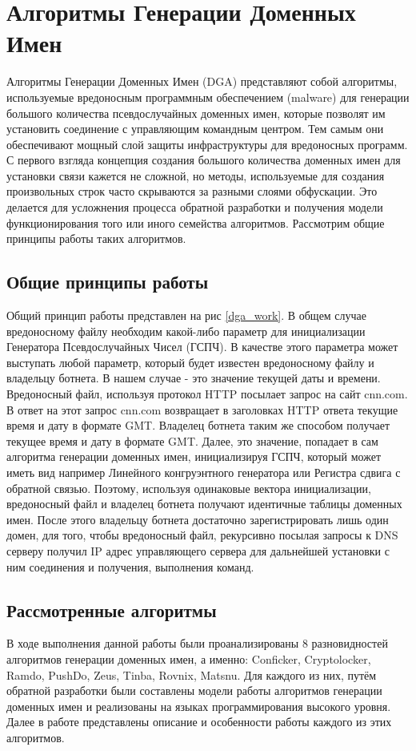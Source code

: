 \section{Алгоритмы Генерации Доменных Имен}\label{dga}
Алгоритмы Генерации Доменных Имен (DGA) представляют собой алгоритмы, используемые вредоносным программным обеспечением (malware) для генерации большого количества псевдослучайных доменных имен, которые позволят им установить соединение с управляющим командным центром. Тем самым они обеспечивают мощный слой защиты инфраструктуры для вредоносных программ. С первого взгляда концепция создания большого количества доменных имен для установки связи кажется не сложной, но методы, используемые для создания произвольных строк часто скрываются за разными слоями обфускации. Это делается для усложнения процесса обратной разработки и получения модели функционирования того или иного семейства алгоритмов. Рассмотрим общие принципы работы таких алгоритмов.
    \subsection{Общие принципы работы}\label{work_princip}
        Общий принцип работы представлен на рис \ref{dga_work}. В общем случае вредоносному файлу необходим какой-либо параметр для инициализации Генератора Псевдослучайных Чисел (ГСПЧ). В качестве этого параметра может выступать любой параметр, который будет известен вредоносному файлу и владельцу ботнета. В нашем случае - это значение текущей даты и времени. Вредоносный файл, используя протокол HTTP посылает запрос на сайт cnn.com. В ответ на этот запрос cnn.com возвращает в заголовках HTTP ответа текущие время и дату в формате GMT. Владелец ботнета таким же способом получает текущее время и дату в формате GMT. Далее, это значение, попадает в сам алгоритма генерации доменных имен, инициализируя ГСПЧ, который может иметь вид например Линейного конгруэнтного генератора или  Регистра сдвига с обратной связью. Поэтому, используя одинаковые вектора инициализации, вредоносный файл и владелец ботнета получают идентичные таблицы доменных имен.
        После этого владельцу ботнета достаточно зарегистрировать лишь один домен, для того, чтобы вредоносный файл, рекурсивно посылая запросы к DNS серверу получил IP адрес управляющего сервера для дальнейшей установки с ним соединения и получения, выполнения команд.
    \subsection{Рассмотренные алгоритмы}
    В ходе выполнения данной работы были проанализированы 8 разновидностей алгоритмов генерации доменных имен, а именно: Conficker, Cryptolocker, Ramdo, PushDo, Zeus, Tinba, Rovnix, Matsnu. Для каждого из них, путём обратной разработки были составлены модели работы алгоритмов генерации доменных имен и реализованы на языках программирования высокого уровня. Далее в работе представлены описание и особенности работы каждого из этих алгоритмов.

